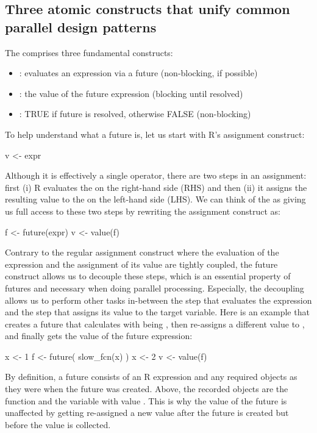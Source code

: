 \subsection{Three atomic constructs that unify common parallel design patterns}
\label{low-level-generalized-parallelization-model}

The  comprises three fundamental constructs:
\begin{itemize}
\item
   : evaluates an expression via a
  future (non-blocking, if possible)
\item
   : the value of the future
  expression  (blocking until resolved)
\item
   : TRUE if future is resolved,
  otherwise FALSE (non-blocking)
\end{itemize}
%
To help understand what a future is, let us start with R's assignment
construct:
\begin{example}
v <- expr
\end{example}
Although it is effectively a single operator, there are two steps in
an assignment: first (i) R evaluates the  on the
right-hand side (RHS) and then (ii) it assigns the resulting value to
the  on the left-hand side (LHS).  We can think of
the  as giving us full access to these two steps by
rewriting the assignment construct as:
\begin{example}
f <- future(expr)
v <- value(f)
\end{example}
Contrary to the regular assignment construct where the evaluation of
the expression and the assignment of its value are tightly coupled,
the future construct allows us to decouple these steps, which is an
essential property of futures and necessary when doing parallel
processing.  Especially, the decoupling allows us to perform other
tasks in-between the step that evaluates the expression and the step
that assigns its value to the target variable.
%
Here is an example that creates a future that calculates
 with  being , then re-assigns
a different value to , and finally gets the value of the
future expression:
\begin{example}
x <- 1
f <- future({
  slow_fcn(x)
})
x <- 2
v <- value(f)
\end{example}
By definition, a future consists of an R expression and any required
objects as they were when the future was created. Above, the recorded
objects are the function  and the variable 
with value .  This is why the value of the future is
unaffected by  getting re-assigned a new value after the
future is created but before the value is collected.

